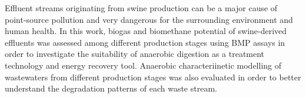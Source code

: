 Effluent streams originating from swine production can be a major cause of point-source pollution and very dangerous for the surrounding environment and human health. In this work, biogas and biomethane potential of swine-derived effluents was assessed among different production stages using BMP assays in order to investigate the suitability of anaerobic digestion as a treatment technology and energy recovery tool. Anaerobic characteriinetic modelling of wastewaters from different production stages was also evaluated in order to better understand the degradation patterns of each waste stream.